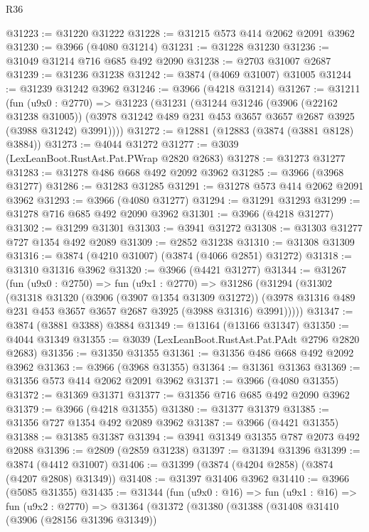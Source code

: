 \begin{lexlean}{R36}
\begin{coremodule}
@31223 := @31220 @31222
@31228 := @31215 @573 @414 @2062 @2091 @3962
@31230 := @3966 (@4080 @31214)
@31231 := @31228 @31230
@31236 := @31049 @31214 @716 @685 @492 @2090
@31238 := @2703 @31007 @2687
@31239 := @31236 @31238
@31242 := @3874 (@4069 @31007) @31005
@31244 := @31239 @31242 @3962
@31246 := @3966 (@4218 @31214)
@31267 := @31211
    (fun (u9x0 : @2770) =>
    @31223
      (@31231
        (@31244
          @31246
          (@3906 (@22162 @31238 @31005))
          (@3978 @31242 @489 @231 @453 @3657 @3657 @2687 @3925 (@3988 @31242) @3991))))
@31272 := @12881 (@12883 (@3874 (@3881 @8128) @3884))
@31273 := @4044 @31272
@31277 := @3039 (LexLeanBoot.RustAst.Pat.PWrap @2820 @2683)
@31278 := @31273 @31277
@31283 := @31278 @486 @668 @492 @2092 @3962
@31285 := @3966 (@3968 @31277)
@31286 := @31283 @31285
@31291 := @31278 @573 @414 @2062 @2091 @3962
@31293 := @3966 (@4080 @31277)
@31294 := @31291 @31293
@31299 := @31278 @716 @685 @492 @2090 @3962
@31301 := @3966 (@4218 @31277)
@31302 := @31299 @31301
@31303 := @3941 @31272
@31308 := @31303 @31277 @727 @1354 @492 @2089
@31309 := @2852 @31238
@31310 := @31308 @31309
@31316 := @3874 (@4210 @31007) (@3874 (@4066 @2851) @31272)
@31318 := @31310 @31316 @3962
@31320 := @3966 (@4421 @31277)
@31344 := @31267
    (fun (u9x0 : @2750) =>
    fun (u9x1 : @2770) =>
    @31286
      (@31294
        (@31302
          (@31318
            @31320
            (@3906 (@3907 @1354 @31309 @31272))
            (@3978 @31316 @489 @231 @453 @3657 @3657 @2687 @3925 (@3988 @31316) @3991)))))
@31347 := @3874 (@3881 @3388) @3884
@31349 := @13164 (@13166 @31347)
@31350 := @4044 @31349
@31355 := @3039 (LexLeanBoot.RustAst.Pat.PAdt @2796 @2820 @2683)
@31356 := @31350 @31355
@31361 := @31356 @486 @668 @492 @2092 @3962
@31363 := @3966 (@3968 @31355)
@31364 := @31361 @31363
@31369 := @31356 @573 @414 @2062 @2091 @3962
@31371 := @3966 (@4080 @31355)
@31372 := @31369 @31371
@31377 := @31356 @716 @685 @492 @2090 @3962
@31379 := @3966 (@4218 @31355)
@31380 := @31377 @31379
@31385 := @31356 @727 @1354 @492 @2089 @3962
@31387 := @3966 (@4421 @31355)
@31388 := @31385 @31387
@31394 := @3941 @31349 @31355 @787 @2073 @492 @2088
@31396 := @2809 (@2859 @31238)
@31397 := @31394 @31396
@31399 := @3874 (@4412 @31007)
@31406 := @31399 (@3874 (@4204 @2858) (@3874 (@4207 @2808) @31349))
@31408 := @31397 @31406 @3962
@31410 := @3966 (@5085 @31355)
@31435 := @31344
    (fun (u9x0 : @16) =>
    fun (u9x1 : @16) =>
    fun (u9x2 : @2770) =>
    @31364
      (@31372
        (@31380
          (@31388
            (@31408
              @31410
              (@3906 (@28156 @31396 @31349))

\end{coremodule}
\end{lexlean}

